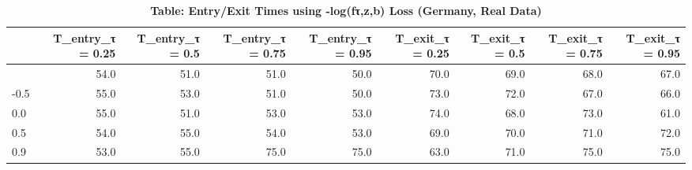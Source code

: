 \begin{table}[t]
\caption*{
{\large \textbf{Table: Entry/Exit Times using -log(fτ,z,b) Loss (Germany, Real Data)}}
} 
\begin{tabular*}{\linewidth}{@{\extracolsep{\fill}}l|rrrrrrrr}
\toprule
 & T\_entry\_τ = 0.25 & T\_entry\_τ = 0.5 & T\_entry\_τ = 0.75 & T\_entry\_τ = 0.95 & T\_exit\_τ = 0.25 & T\_exit\_τ = 0.5 & T\_exit\_τ = 0.75 & T\_exit\_τ = 0.95 \\ 
\midrule\addlinespace[2.5pt]
-0.9 & 54.0 & 51.0 & 51.0 & 50.0 & 70.0 & 69.0 & 68.0 & 67.0 \\ 
-0.5 & 55.0 & 53.0 & 51.0 & 50.0 & 73.0 & 72.0 & 67.0 & 66.0 \\ 
0.0 & 55.0 & 51.0 & 53.0 & 53.0 & 74.0 & 68.0 & 73.0 & 61.0 \\ 
0.5 & 54.0 & 55.0 & 54.0 & 53.0 & 69.0 & 70.0 & 71.0 & 72.0 \\ 
0.9 & 53.0 & 55.0 & 75.0 & 75.0 & 63.0 & 71.0 & 75.0 & 75.0 \\ 
\bottomrule
\end{tabular*}
\end{table}

